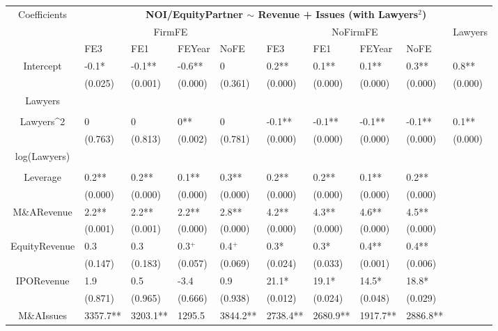 \documentclass{article}
\begin{document}
\begin{table}[H]
\centering
\begin{tabular}{|clllllllll|}
\hline
\multirow{3}{*}{Coefficients} & \multicolumn{9}{c|}{\textbf{NOI/EquityPartner $\sim$ Revenue + Issues (with Lawyers$^2$)}} \\
\cline{2-10}
& \multicolumn{4}{c}{FirmFE} & \multicolumn{4}{c}{NoFirmFE} & \multirow{2}{*}{Lawyers} \\
\cline{2-9}
& FE3 & FE1 & FEYear & NoFE & FE3 & FE1 & FEYear & NoFE &  \\
\hline
 
Intercept & -0.1* & -0.1** & -0.6** & 0 & 0.2** & 0.1** & 0.1** & 0.3** & 0.8** \\ 
   & (0.025) & (0.001) & (0.000) & (0.361) & (0.000) & (0.000) & (0.000) & (0.000) & (0.000) \\ 
  Lawyers &  &  &  &  &  &  &  &  &  \\ 
   &  &  &  &  &  &  &  &  &  \\ 
  Lawyers^2 & 0 & 0 & 0** & 0 & -0.1** & -0.1** & -0.1** & -0.1** & 0.1** \\ 
   & (0.763) & (0.813) & (0.002) & (0.781) & (0.000) & (0.000) & (0.000) & (0.000) & (0.000) \\ 
  log(Lawyers) &  &  &  &  &  &  &  &  &  \\ 
   &  &  &  &  &  &  &  &  &  \\ 
  Leverage & 0.2** & 0.2** & 0.1** & 0.3** & 0.2** & 0.2** & 0.1** & 0.2** &  \\ 
   & (0.000) & (0.000) & (0.000) & (0.000) & (0.000) & (0.000) & (0.000) & (0.000) &  \\ 
  M\&ARevenue & 2.2** & 2.2** & 2.2** & 2.8** & 4.2** & 4.3** & 4.6** & 4.5** &  \\ 
   & (0.001) & (0.001) & (0.000) & (0.000) & (0.000) & (0.000) & (0.000) & (0.000) &  \\ 
  EquityRevenue & 0.3 & 0.3 & 0.3$^{+}$ & 0.4$^{+}$ & 0.3* & 0.3* & 0.4** & 0.4** &  \\ 
   & (0.147) & (0.183) & (0.057) & (0.069) & (0.024) & (0.033) & (0.001) & (0.006) &  \\ 
  IPORevenue & 1.9 & 0.5 & -3.4 & 0.9 & 21.1* & 19.1* & 14.5* & 18.8* &  \\ 
   & (0.871) & (0.965) & (0.666) & (0.938) & (0.012) & (0.024) & (0.048) & (0.029) &  \\ 
  M\&AIssues & 3357.7** & 3203.1** & 1295.5 & 3844.2** & 2738.4** & 2680.9** & 1917.7** & 2886.8** &  \\ 

\end{tabular}
\end{table}
\end{document}
